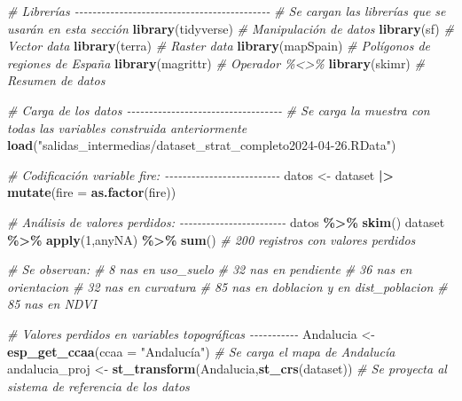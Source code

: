 \documentclass[12pt,a4paper,]{book}
\newenvironment{Shaded}{\begin{snugshade}}{\end{snugshade}}
\newcommand{\AttributeTok}[1]{\textcolor[rgb]{0.13,0.29,0.53}{#1}}
\newcommand{\CommentTok}[1]{\textcolor[rgb]{0.56,0.35,0.01}{\textit{#1}}}
\newcommand{\DecValTok}[1]{\textcolor[rgb]{0.00,0.00,0.81}{#1}}
\newcommand{\FunctionTok}[1]{\textcolor[rgb]{0.13,0.29,0.53}{\textbf{#1}}}
\newcommand{\NormalTok}[1]{#1}
\newcommand{\OtherTok}[1]{\textcolor[rgb]{0.56,0.35,0.01}{#1}}
\newcommand{\SpecialCharTok}[1]{\textcolor[rgb]{0.81,0.36,0.00}{\textbf{#1}}}
\newcommand{\StringTok}[1]{\textcolor[rgb]{0.31,0.60,0.02}{#1}}
\numberwithin{dummy}{section}
\theoremstyle{ocrenumbox}
\theoremstyle{blacknumex}
\theoremstyle{blacknumbox}
\theoremstyle{ocrenum}
\theoremstyle{ocrenum}
\begin{document}
\begin{Shaded}
\begin{Highlighting}[]
\CommentTok{\# Librerías {-}{-}{-}{-}{-}{-}{-}{-}{-}{-}{-}{-}{-}{-}{-}{-}{-}{-}{-}{-}{-}{-}{-}{-}{-}{-}{-}{-}{-}{-}{-}{-}{-}{-}{-}{-}{-}{-}{-}{-}{-}{-}{-}{-}}
\CommentTok{\# Se cargan las librerías que se usarán en esta sección}
\FunctionTok{library}\NormalTok{(tidyverse) }\CommentTok{\# Manipulación de datos }
\FunctionTok{library}\NormalTok{(sf) }\CommentTok{\# Vector data}
\FunctionTok{library}\NormalTok{(terra) }\CommentTok{\# Raster data}
\FunctionTok{library}\NormalTok{(mapSpain) }\CommentTok{\# Polígonos de regiones de España}
\FunctionTok{library}\NormalTok{(magrittr) }\CommentTok{\# Operador \%\textless{}\textgreater{}\% }
\FunctionTok{library}\NormalTok{(skimr) }\CommentTok{\# Resumen de datos}

\CommentTok{\# Carga de los datos {-}{-}{-}{-}{-}{-}{-}{-}{-}{-}{-}{-}{-}{-}{-}{-}{-}{-}{-}{-}{-}{-}{-}{-}{-}{-}{-}{-}{-}{-}{-}{-}{-}{-}{-}}
\CommentTok{\# Se carga la muestra con todas las variables construida anteriormente}
\FunctionTok{load}\NormalTok{(}\StringTok{"salidas\_intermedias/dataset\_strat\_completo2024{-}04{-}26.RData"}\NormalTok{)}


\CommentTok{\# Codificación variable fire: {-}{-}{-}{-}{-}{-}{-}{-}{-}{-}{-}{-}{-}{-}{-}{-}{-}{-}{-}{-}{-}{-}{-}{-}{-}{-}}
\NormalTok{datos }\OtherTok{\textless{}{-}}\NormalTok{ dataset }\SpecialCharTok{|\textgreater{}} 
  \FunctionTok{mutate}\NormalTok{(}\AttributeTok{fire =} \FunctionTok{as.factor}\NormalTok{(fire))}

\CommentTok{\# Análisis de valores perdidos: {-}{-}{-}{-}{-}{-}{-}{-}{-}{-}{-}{-}{-}{-}{-}{-}{-}{-}{-}{-}{-}{-}{-}{-}}
\NormalTok{datos }\SpecialCharTok{\%\textgreater{}\%} \FunctionTok{skim}\NormalTok{()}
\NormalTok{dataset }\SpecialCharTok{\%\textgreater{}\%} \FunctionTok{apply}\NormalTok{(}\DecValTok{1}\NormalTok{,anyNA) }\SpecialCharTok{\%\textgreater{}\%} \FunctionTok{sum}\NormalTok{() }\CommentTok{\# 200 registros con valores perdidos}

\CommentTok{\# Se observan:}
\CommentTok{\#   8 nas en uso\_suelo}
\CommentTok{\#   32 nas en pendiente}
\CommentTok{\#   36 nas en orientacion}
\CommentTok{\#   32 nas en curvatura}
\CommentTok{\#   85 nas en doblacion y en dist\_poblacion}
\CommentTok{\#   85 nas en NDVI}

\CommentTok{\# Valores perdidos en variables topográficas {-}{-}{-}{-}{-}{-}{-}{-}{-}{-}{-}}
\NormalTok{Andalucia }\OtherTok{\textless{}{-}} \FunctionTok{esp\_get\_ccaa}\NormalTok{(}\AttributeTok{ccaa =} \StringTok{"Andalucía"}\NormalTok{) }\CommentTok{\# Se carga el mapa de Andalucía}
\NormalTok{andalucia\_proj }\OtherTok{\textless{}{-}} \FunctionTok{st\_transform}\NormalTok{(Andalucia,}\FunctionTok{st\_crs}\NormalTok{(dataset)) }\CommentTok{\# Se proyecta al sistema de referencia de los datos}


\end{Highlighting}
\end{Shaded}
\end{document}
